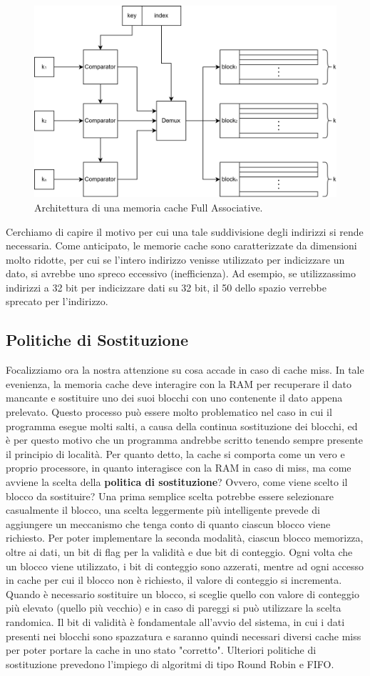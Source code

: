 \begin{figure}[!h]
    \centering
    \includegraphics[width=0.7\linewidth]{img/full-assoc.png}
    \caption{Architettura di una memoria cache Full Associative.}
    \label{fig:full-ass}
\end{figure}

Cerchiamo di capire il motivo per cui una tale suddivisione degli indirizzi si rende necessaria. Come anticipato, le memorie cache sono caratterizzate da dimensioni molto ridotte, per cui se l'intero indirizzo venisse utilizzato per indicizzare un dato, si avrebbe uno spreco eccessivo (inefficienza). Ad esempio, se utilizzassimo indirizzi a 32 bit per indicizzare dati su 32 bit, il 50 dello spazio verrebbe sprecato per l'indirizzo.

\subsection{Politiche di Sostituzione}
Focalizziamo ora la nostra attenzione su cosa accade in caso di cache miss. In tale evenienza, la memoria cache deve interagire con la RAM per recuperare il dato mancante e sostituire uno dei suoi blocchi con uno contenente il dato appena prelevato. Questo processo può essere molto problematico nel caso in cui il programma esegue molti salti, a causa della continua sostituzione dei blocchi, ed è per questo motivo che un programma andrebbe scritto tenendo sempre presente il principio di località. Per quanto detto, la cache si comporta come un vero e proprio processore, in quanto interagisce con la RAM in caso di miss, ma come avviene la scelta della \textbf{politica di sostituzione}? Ovvero, come viene scelto il blocco da sostituire? Una prima semplice scelta potrebbe essere selezionare casualmente il blocco, una scelta leggermente più intelligente prevede di aggiungere un meccanismo che tenga conto di quanto ciascun blocco viene richiesto. Per poter implementare la seconda modalità, ciascun blocco memorizza, oltre ai dati, un bit di flag per la validità e due bit di conteggio. Ogni volta che un blocco viene utilizzato, i bit di conteggio sono azzerati, mentre ad ogni accesso in cache per cui il blocco non è richiesto, il valore di conteggio si incrementa. Quando è necessario sostituire un blocco, si sceglie quello con valore di conteggio più elevato (quello più vecchio) e in caso di pareggi si può utilizzare la scelta randomica. Il bit di validità è fondamentale all'avvio del sistema, in cui i dati presenti nei blocchi sono spazzatura e saranno quindi necessari diversi cache miss per poter portare la cache in uno stato "corretto". Ulteriori politiche di sostituzione prevedono l'impiego di algoritmi di tipo Round Robin e FIFO.

